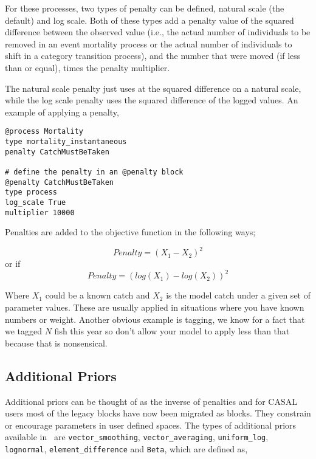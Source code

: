 For these processes, two types of penalty can be defined, natural scale (the default) and log scale. Both of these types add a penalty value of the squared difference between the observed value (i.e., the actual number of individuals to be removed in an event mortality process or the actual number of individuals to shift in a category transition process), and the number that were moved (if less than or equal), times the penalty multiplier.

The natural scale penalty just uses at the squared difference on a natural scale, while the log scale penalty uses the squared difference of the logged values. An example of applying a penalty,

{\small{\begin{verbatim}
@process Mortality
type mortality_instantaneous
penalty CatchMustBeTaken

# define the penalty in an @penalty block
@penalty CatchMustBeTaken
type process
log_scale True
multiplier 10000
\end{verbatim}}}

Penalties are added to the objective function in the following ways;

\begin{equation}
	Penalty = (X_1 - X_2)^2
\end{equation}
or if 
\begin{equation}
Penalty = (log(X_1) - log(X_2))^2
\end{equation}

Where $X_1$ could be a known catch and $X_2$ is the model catch under a given set of parameter values. These are usually applied in situations where you have known numbers or weight. Another obvious example is tagging, we know for a fact that we tagged $N$ fish this year so don't allow your model to apply less than that because that is nonsensical.

\subsection{Additional Priors\label{sec:additional_priors}}

Additional priors can be thought of as the inverse of penalties and for CASAL users most of the legacy  blocks have now been migrated as  blocks. They constrain or encourage parameters in user defined spaces. The types of additional priors available in \CNAME\ are \texttt{vector\_smoothing}, \texttt{vector\_averaging}, \texttt{uniform\_log}, \texttt{lognormal}, \texttt{element\_difference} and \texttt{Beta}, which are defined as,

